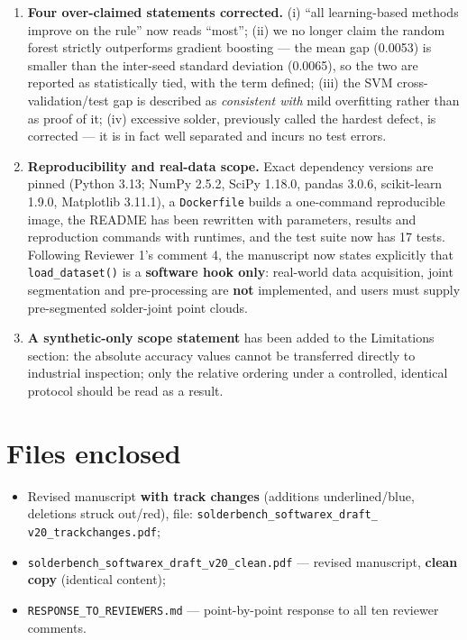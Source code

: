 \documentclass[11pt]{article}
\begin{document}
\begin{enumerate}[leftmargin=*,itemsep=3pt]
\item \textbf{Four over-claimed statements corrected.} (i) ``all learning-based methods
improve on the rule'' now reads ``most''; (ii) we no longer claim the random forest strictly
outperforms gradient boosting --- the mean gap (0.0053) is smaller than the inter-seed
standard deviation (0.0065), so the two are reported as statistically tied, with the term
defined; (iii) the SVM cross-validation/test gap is described as \emph{consistent with}
mild overfitting rather than as proof of it; (iv) excessive solder, previously called the
hardest defect, is corrected --- it is in fact well separated and incurs no test errors.

\item \textbf{Reproducibility and real-data scope.} Exact dependency versions are pinned
(Python 3.13; NumPy 2.5.2, SciPy 1.18.0, pandas 3.0.6, scikit-learn 1.9.0, Matplotlib
3.11.1), a \texttt{Dockerfile} builds a one-command reproducible image, the README has been
rewritten with parameters, results and reproduction commands with runtimes, and the test
suite now has 17 tests. Following Reviewer 1's comment 4, the manuscript now states
explicitly that \texttt{load\_dataset()} is a \textbf{software hook only}: real-world data
acquisition, joint segmentation and pre-processing are \textbf{not} implemented, and users
must supply pre-segmented solder-joint point clouds.

\item \textbf{A synthetic-only scope statement} has been added to the Limitations section:
the absolute accuracy values cannot be transferred directly to industrial inspection; only
the relative ordering under a controlled, identical protocol should be read as a result.
\end{enumerate}

\section*{Files enclosed}

\begin{itemize}[leftmargin=*,itemsep=2pt]
\item Revised manuscript \textbf{with track changes} (additions underlined/blue, deletions
struck out/red), file: \texttt{solderbench\_softwarex\_draft\_}\\ \texttt{v20\_trackchanges.pdf};
\item \texttt{solderbench\_softwarex\_draft\_v20\_clean.pdf} --- revised manuscript,
\textbf{clean copy} (identical content);
\item \texttt{RESPONSE\_TO\_REVIEWERS.md} --- point-by-point response to all ten reviewer comments.
\end{itemize}
\end{document}
